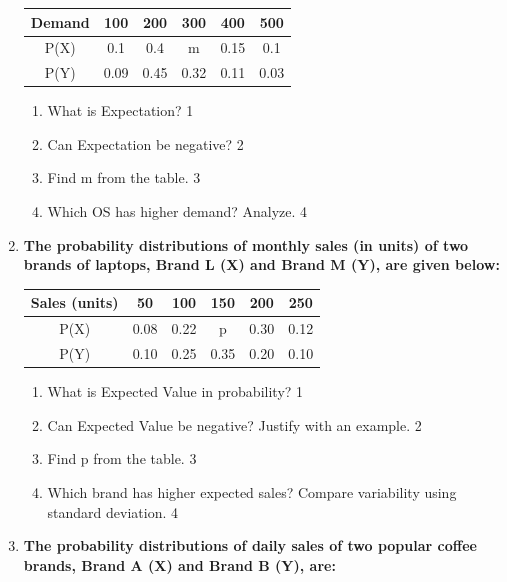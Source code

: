 \documentclass[a4paper,oneside]{book}
\begin{document}
\begin{enumerate}
	    \begin{table}[h]
	    	  \begin{center}
\begin{tabular}{c|c|c|c|c|c}
Demand & 100  & 200  & 300  & 400  & 500  \\ \hline
P(X)   & 0.1  & 0.4  & m    & 0.15 & 0.1  \\ \hline
P(Y)   & 0.09 & 0.45 & 0.32 & 0.11 & 0.03
\end{tabular}
	  \end{center}
\end{table}
  
  \begin{enumerate}
    \item
	What is Expectation? \hfill 1
    \item
	Can Expectation be negative? \hfill 2
    \item  
	Find m from the table. \hfill 3
    \item
	Which OS has higher demand? Analyze. \hfill 4
  \end{enumerate}
  
  \item
\textbf{The probability distributions of monthly sales (in units) of two brands of laptops, Brand L (X) and Brand M (Y), are given below:}

\begin{table}[h]
\centering
\begin{tabular}{c|c|c|c|c|c}
Sales (units) & 50  & 100 & 150 & 200 & 250 \\ \hline
P(X)          & 0.08 & 0.22 & p   & 0.30 & 0.12 \\ \hline
P(Y)          & 0.10 & 0.25 & 0.35 & 0.20 & 0.10
\end{tabular}
\end{table}

\begin{enumerate}
    \item
    What is Expected Value in probability? \hfill 1
    \item
    Can Expected Value be negative? Justify with an example. \hfill 2
    \item
    Find p from the table. \hfill 3
    \item
    Which brand has higher expected sales? Compare variability using standard deviation. \hfill 4
\end{enumerate}
  
  \item
	  \textbf{The probability distributions of daily sales of two popular coffee brands, Brand A (X) and Brand B (Y), are:} 
	  

\end{enumerate}
\end{document}
